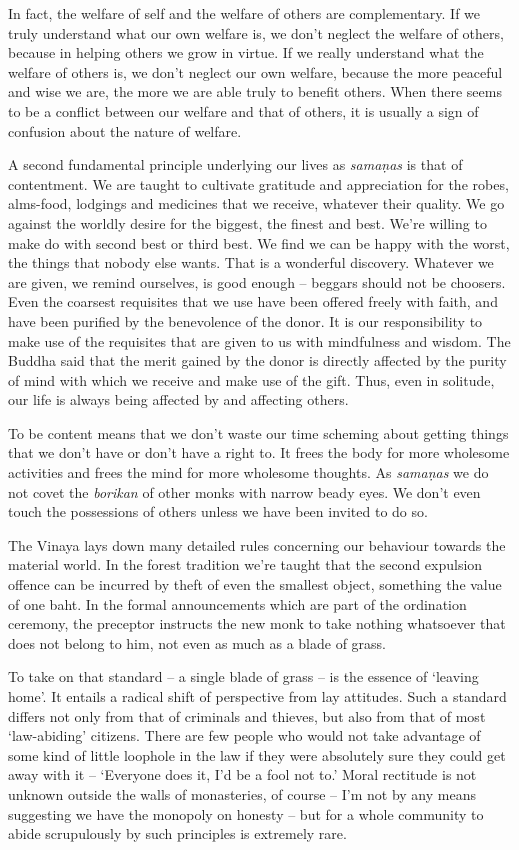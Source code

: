 In fact, the welfare of self and the welfare of others are
complementary. If we truly understand what our own welfare is, we don't
neglect the welfare of others, because in helping others we grow in
virtue. If we really understand what the welfare of others is, we don't
neglect our own welfare, because the more peaceful and wise we are, the
more we are able truly to benefit others. When there seems to be a
conflict between our welfare and that of others, it is usually a sign of
confusion about the nature of welfare. 

A second fundamental principle underlying our lives as \emph{samaṇas} is
that of contentment. We are taught to cultivate gratitude and
appreciation for the robes, alms-food, lodgings and medicines that we
receive, whatever their quality. We go against the worldly desire for
the biggest, the finest and best. We're willing to make do with second
best or third best. We find we can be happy with the worst, the things
that nobody else wants. That is a wonderful discovery. Whatever we are
given, we remind ourselves, is good enough -- beggars should not be
choosers. Even the coarsest requisites that we use have been offered
freely with faith, and have been purified by the benevolence of the
donor. It is our responsibility to make use of the requisites that are
given to us with mindfulness and wisdom. The Buddha said that the merit
gained by the donor is directly affected by the purity of mind with which
we receive and make use of the gift. Thus, even in solitude, our life is
always being affected by and affecting others. 

To be content means that we don't waste our time scheming about getting
things that we don't have or don't have a right to. It frees the body
for more wholesome activities and frees the mind for more wholesome
thoughts. As \emph{samaṇas} we do not covet the \emph{borikan} of other
monks with narrow beady eyes. We don't even touch the possessions of
others unless we have been invited to do so. 

The Vinaya lays down many detailed rules concerning our behaviour
towards the material world. In the forest tradition we're taught that
the second expulsion offence can be incurred by theft of even the
smallest object, something the value of one baht.
In the formal announcements which are part of the ordination
ceremony, the preceptor instructs the new monk to take nothing
whatsoever that does not belong to him, not even as much as a blade of
grass. 

To take on that standard -- a single blade of grass -- is the essence
of `leaving home'. It entails a radical shift of perspective from lay
attitudes. Such a standard differs not only from that of criminals and
thieves, but also from that of most `law-abiding' citizens. There are
few people who would not take advantage of some kind of little loophole
in the law if they were absolutely sure they could get away with it --
`Everyone does it, I'd be a fool not to.' Moral rectitude is not unknown
outside the walls of monasteries, of course -- I'm not by any means
suggesting we have the monopoly on honesty -- but for a whole community
to abide scrupulously by such principles is extremely rare. 


